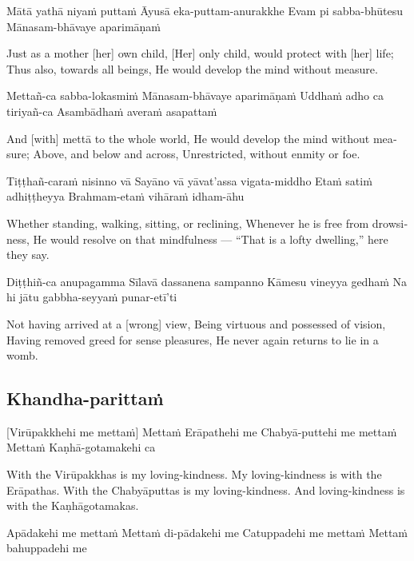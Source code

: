 Mātā yathā niyaṁ puttaṁ
Āyusā eka-puttam-anurakkhe
Evam pi sabba-bhūtesu
Mānasam-bhāvaye aparimāṇaṁ

\begin{english}
  Just as a mother [her] own child,
  [Her] only child, would protect with [her] life;
  Thus also, towards all beings,
  He would develop the mind without measure.
\end{english}

Mettañ-ca sabba-lokasmiṁ
Mānasam-bhāvaye aparimāṇaṁ
Uddhaṁ adho ca tiriyañ-ca
Asambādhaṁ averaṁ asapattaṁ

\begin{english}
  And [with] mettā to the whole world,
  He would develop the mind without measure;
  Above, and below and across,
  Unrestricted, without enmity or foe.
\end{english}

Tiṭṭhañ-caraṁ nisinno vā
Sayāno vā yāvat’assa vigata-middho
Etaṁ satiṁ adhiṭṭheyya
Brahmam-etaṁ vihāraṁ idham-āhu

\begin{english}
  Whether standing, walking, sitting, or reclining,
  Whenever he is free from drowsiness,
  He would resolve on that mindfulness —
  “That is a lofty dwelling,” here they say.
\end{english}

Diṭṭhiñ-ca anupagamma
Sīlavā dassanena sampanno
Kāmesu vineyya gedhaṁ
Na hi jātu gabbha-seyyaṁ punar-etī’ti

\begin{english}
  Not having arrived at a [wrong] view,
  Being virtuous and possessed of vision,
  Having removed greed for sense pleasures,
  He never again returns to lie in a womb.
\end{english}

\suttaRef{[Snp 1.8]}

\subsection{Khandha-parittaṁ}
[Virūpakkhehi me mettaṁ]
Mettaṁ Erāpathehi me
Chabyā-puttehi me mettaṁ
Mettaṁ Kaṇhā-gotamakehi ca

\begin{english}
  With the Virūpakkhas is my loving-kindness.
  My loving-kindness is with the Erāpathas.
  With the Chabyāputtas is my loving-kindness.
  And loving-kindness is with the Kaṇhāgotamakas.
\end{english}

Apādakehi me mettaṁ
Mettaṁ di-pādakehi me
Catuppadehi me mettaṁ
Mettaṁ bahuppadehi me

